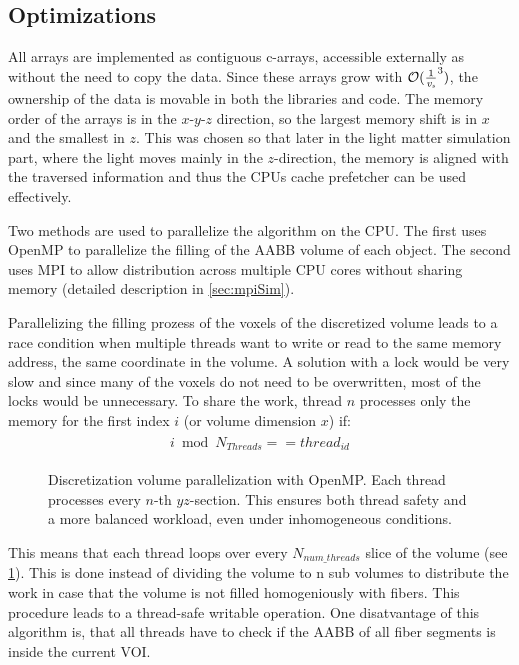 \subsection{Optimizations}\label{sec:dvOpti}
%
All arrays are implemented as contiguous c-arrays, accessible externally as  without the need to copy the data.
Since these arrays grow with $\mathcal{O}(\frac{1}{\textnormal{$\mathit{v_{s}}$}}^3)$, the ownership of the data is movable in both the \cpp{} libraries and \python{} code.
The memory order of the arrays is in the $x\text{-}y\text{-}z$ direction, so the largest memory shift is in $x$ and the smallest in $z$.
This was chosen so that later in the light matter simulation part, where the light moves mainly in the $z$-direction, the memory is aligned with the traversed information and thus the \acp{CPU} cache prefetcher can be used effectively.
\par
%
Two methods are used to parallelize the algorithm on the \ac{CPU}.
The first uses \ac{OpenMP} to parallelize the filling of the \ac{AABB} volume of each object.
The second uses \ac{MPI} to allow distribution across multiple \ac{CPU} cores without sharing memory (detailed description in \cref{sec:mpiSim}).
\par
%
Parallelizing the filling prozess of the voxels of the discretized volume leads to a race condition when multiple threads want to write or read to the same memory address, \ie{} the same coordinate in the volume.
A solution with a lock would be very slow and since many of the voxels do not need to be overwritten, most of the locks would be unnecessary.
To share the work, thread $n$ processes only the memory for the first index $i$ (or volume dimension $x$) if:
%
\begin{align}
\begin{split}
    i \bmod N_{\mathit{Threads}} == \mathit{thread}_{\mathit{id}}
\end{split}
\end{align}
%
\begin{figure}[!t]
\centering
\setlength{\tikzwidth}{0.5\textwidth}
\caption{Discretization volume parallelization with \ac{OpenMP}. Each thread processes every $n$-th $yz$-section. This ensures both thread safety and a more balanced workload, even under inhomogeneous conditions.}
\label{fig:discVolThread}
\end{figure}
% 
This means that each thread loops over every $N_{\mathit{num\_threads}}$ slice of the volume (see \cref{fig:discVolThread}).
This is done instead of dividing the volume to n sub volumes to distribute the work in case that the volume is not filled homogeniously with fibers.
This procedure leads to a thread-safe writable operation.
One disatvantage of this algorithm is, that all threads have to check if the \ac{AABB} of all fiber segments is inside the current \ac{VOI}.
% 
% 
%
